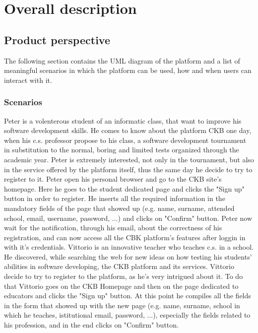 \documentclass{article}
\newcounter{subsubsubsection}[subsubsection]
\begin{document}
{\newpage

\pagestyle{OverallDescriptionStyle}

\section{Overall description}
\subsection{Product perspective}
The following section contains the UML diagram of the platform and a list of meaningful scenarios in which the platform can be used, how and when users can interact with it.
\subsubsection{Scenarios}
Peter is a volenterous student of an informatic class, that want to improve his software development skills. He comes to know about the platform CKB one day, when his c.s. professor propose to his class, a software development tournament in substitution to the normal, boring and limited tests organized through the academic year.
Peter is extremely interested, not only in the tournament, but also in the service offered by the platform itself, thus the same day he decide to try to register to it.
Peter open his personal browser and go to the CKB site's homepage. Here he goes to the student dedicated page and clicks the "Sign up" button in order to register. He inserts all the required information in the mandatory fields of the page that showed up (e.g. name, surname, attended school, email, username, password, ...) and clicks on "Confirm" button.
Peter now wait for the notification, through his email, about the correctness of his registration, and can now access all the CBK platform's features after loggin in with it's credentials.
Vittorio is an innovative teacher who teaches c.s. in a school. He discovered, while searching the web for new ideas on how testing his students' abilities in software developing, the CKB platform and its services.
Vittorio decide to try to register to the platform, as he's very intrigued about it. To do that Vittorio goes on the CKB Homepage and then on the page dedicated to educators and clicks the "Sign up" button. At this point he compiles all the fields in the form that showed up with the new page (e.g. name, surname, school in which he teaches, istitutional email, password, ...), especially the fields related to his profession, and in the end clicks on "Confirm" button.
}
\end{document}
